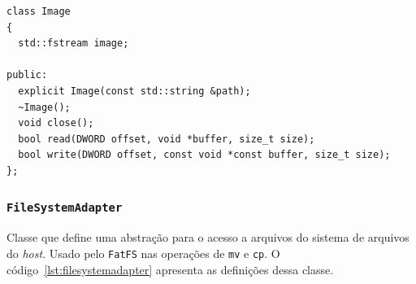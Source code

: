\documentclass[
    12pt,				%
    oneside,   	        %
    a4paper,			%
    english,			%
    french,				%
    spanish,			%
    brazil,				%
    ]{pacotes/abntex2}
\begin{document}
\begin{lstlisting}[caption={Classe para interação do arquivo \texttt{.img} que contém o FAT32 gravado}, label={lst:image}]
class Image
{
  std::fstream image;

public:
  explicit Image(const std::string &path);
  ~Image();
  void close();
  bool read(DWORD offset, void *buffer, size_t size);
  bool write(DWORD offset, const void *const buffer, size_t size);
};
\end{lstlisting}

\subsubsection{\texttt{FileSystemAdapter}}
\label{subsubsec:file_system_adapter}

Classe que define uma abstração para o acesso a arquivos do sistema de arquivos do \textit{host}. Usado pelo \texttt{FatFS} nas operações de \texttt{mv} e \texttt{cp}. O código~\ref{lst:filesystemadapter} apresenta as definições dessa classe.
\end{document}
